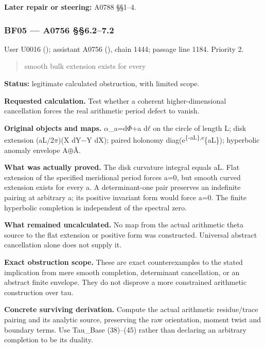 \documentclass[10pt,a4paper,oneside]{report}
\begin{document}
\textbf{Later repair or steering:} A0788 §§1--4.

\subsubsection{BF05 --- A0756 §§6.2--7.2}\label{bf05-a0756-6.27.2}

User U0016 (\protect{});
assistant A0756 (\protect{}),
chain 1444; passage line 1184. Priority 2.

\begin{quote}
smooth bulk extension exists for every
\end{quote}

\textbf{Status:} legitimate calculated obstruction, with limited scope.

\textbf{Requested calculation.} Test whether a coherent
higher-dimensional cancellation forces the real arithmetic period defect
to vanish.

\textbf{Original objects and maps.}
\allowbreak{}\ensuremath{α}\allowbreak{}\_a=d\allowbreak{}\ensuremath{Φ}\allowbreak{}+a
d\allowbreak{}\ensuremath{ℓ}\allowbreak{} on the circle of length L;
disk extension (aL/2\allowbreak{}\ensuremath{π}\allowbreak{})(X
dY\allowbreak{}\ensuremath{−}\allowbreak{}Y dX); paired holonomy
diag(e\textsuperscript{\{-aL\},e}\{aL\}); hyperbolic anomaly envelope
A\allowbreak{}\ensuremath{⊕}\allowbreak{}Â.

\textbf{What was actually proved.} The disk curvature integral equals
aL. Flat extension of the specified meridional period forces a=0, but
smooth curved extension exists for every a. A determinant-one pair
preserves an indefinite pairing at arbitrary a; its positive invariant
form would force a=0. The finite hyperbolic completion is independent of
the spectral zero.

\textbf{What remained uncalculated.} No map from the actual arithmetic
theta source to the flat extension or positive form was constructed.
Universal abstract cancellation alone does not supply it.

\textbf{Exact obstruction scope.} These are exact counterexamples to the
stated implication from mere smooth completion, determinant
cancellation, or an abstract finite envelope. They do not disprove a
more constrained arithmetic construction over tau.

\textbf{Concrete surviving derivation.} Compute the actual arithmetic
residue/trace pairing and its analytic source, preserving the raw
orientation, moment twist and boundary terms. Use Tau\_Base (38)--(45)
rather than declaring an arbitrary completion to be its duality.
\end{document}
